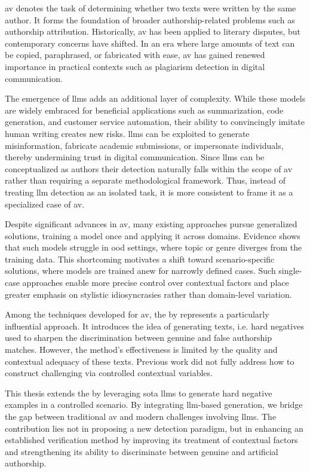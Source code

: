 \ac{av} denotes the task of determining whether two texts were written by the same author. 
It forms the foundation of broader authorship-related problems such as authorship attribution. 
Historically, \ac{av} has been applied to literary disputes, but contemporary concerns have shifted. 
In an era where large amounts of text can be copied, paraphrased, or fabricated with ease, \ac{av} has gained renewed importance in practical contexts such as plagiarism detection in digital communication.

The emergence of \acp{llm} adds an additional layer of complexity. 
While these models are widely embraced for beneficial applications such as summarization, code generation, and customer service automation, their ability to convincingly imitate human writing creates new risks. 
\acp{llm} can be exploited to generate misinformation, fabricate academic submissions, or impersonate individuals, thereby undermining trust in digital communication. 
Since \acp{llm} can be conceptualized as authors their detection naturally falls within the scope of \ac{av} rather than requiring a separate methodological framework. 
Thus, instead of treating \ac{llm} detection as an isolated task, it is more consistent to frame it as a specialized case of \ac{av}.

Despite significant advances in \ac{av}, many existing approaches pursue generalized solutions, training a model once and applying it across domains. 
Evidence shows that such models struggle in \ac{ood} settings, where topic or genre diverges from the training data. 
This shortcoming motivates a shift toward scenario-specific solutions, where models are trained anew for narrowly defined cases. 
Such single-case approaches enable more precise control over contextual factors and place greater emphasis on stylistic idiosyncrasies rather than domain-level variation.

Among the techniques developed for \ac{av}, the \impAppr{} by \citet{koppel_determining_2014} represents a particularly influential approach. 
It introduces the idea of generating \imp{} texts, i.e. hard negatives used to sharpen the discrimination between genuine and false authorship matches. 
However, the method's effectiveness is limited by the quality and contextual adequacy of these \imp{} texts. 
Previous work did not fully address how to construct challenging \imps{} via controlled contextual variables.

This thesis extends the \impAppr{} by leveraging \acl{sota} \acp{llm} to generate hard negative examples in a controlled scenario. 
By integrating \ac{llm}-based \imp{} generation, we bridge the gap between traditional \ac{av} and modern challenges involving \acp{llm}. 
The contribution lies not in proposing a new detection paradigm, but in enhancing an established verification method by improving its treatment of contextual factors and strengthening its ability to discriminate between genuine and artificial authorship.
